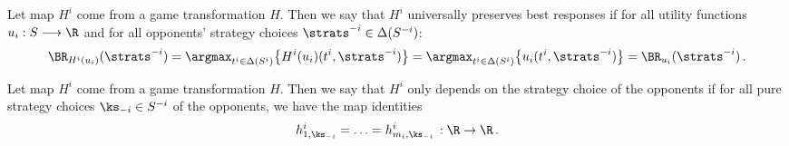 \begin{defn}
\label{defn BR preserving}
Let map $H^i$ come from a game transformation $H$. Then we say that $H^i$ universally preserves best responses if for all utility functions $u_i : S \longrightarrow \R$ and for all opponents' strategy choices $\strats^{-i} \in \Delta(S^{-i})$:
\begin{equation*}
\BR_{H^i(u_i)}(\strats^{-i}) = \argmax_{t^i \in \Delta(S^i)} \big\{ H^i(u_i)(t^i,\strats^{-i}) \big\} = \argmax_{t^i \in \Delta(S^i)} \big\{ u_i(t^i,\strats^{-i}) \big\} = \BR_{u_i}(\strats^{-i}) \, .
\end{equation*}
\end{defn}

\begin{defn}
\label{defn opponent dependence}
Let map $H^i$ come from a game transformation $H$. Then we say that $H^i$ only depends on the strategy choice of the opponents if for all pure strategy choices $\ks_{-i} \in S^{-i}$ of the opponents, we have the map identities
    \[h_{1, \ks_{-i}}^i = \ldots = h_{m_i, \ks_{-i}}^i\,: \R \to \R \, .\]
\end{defn}

